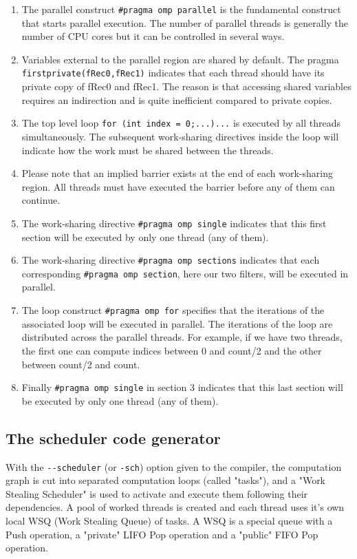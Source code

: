 \documentclass[a4paper,10pt]{book}
\begin{document}
\begin{enumerate}
\item The parallel construct \lstinline!#pragma omp parallel! is the fundamental construct that starts parallel execution. The number of parallel threads is generally the number of CPU cores but it can be controlled in several ways.

\item Variables external to the parallel region are shared by default. The pragma \lstinline!firstprivate(fRec0,fRec1)! indicates that each thread should have its private copy of fRec0 and fRec1. The reason is that accessing shared variables requires an indirection and is quite inefficient compared to private copies.

\item The top level loop \lstinline!for (int index = 0;...)...! is executed by all threads simultaneously. The subsequent work-sharing directives inside the loop will indicate how the work must be shared between the threads. 

\item Please note that an implied barrier exists at the end of each work-sharing region. All threads must have executed the barrier before any of them can continue.

\item The work-sharing directive \lstinline!#pragma omp single! indicates that this first section will be executed by only one thread (any of them).

\item The work-sharing directive \lstinline!#pragma omp sections! indicates that each corresponding \lstinline!#pragma omp section!, here our two filters, will be executed in parallel.

\item The loop construct \lstinline!#pragma omp for! specifies that the iterations of the associated loop will be executed in parallel. The iterations of the loop are distributed across the parallel threads. For example, if we have two threads, the first one can compute indices between 0 and count/2 and the other between count/2 and count. 

\item Finally \lstinline!#pragma omp single!  in section 3 indicates that this last section will be executed by only one thread (any of them).

\end{enumerate}

\subsection{The scheduler code generator}
 With the \lstinline!--scheduler! (or \lstinline!-sch!) option given to the \faust compiler, the computation graph is cut into separated computation loops (called "tasks"), and a "Work Stealing Scheduler" is used to activate and execute them following their dependencies. A pool of worked threads is created and each thread uses it's own local WSQ (Work Stealing Queue) of tasks. A WSQ is a special queue with a Push operation, a "private" LIFO Pop operation and a "public" FIFO Pop operation.
\end{document}
